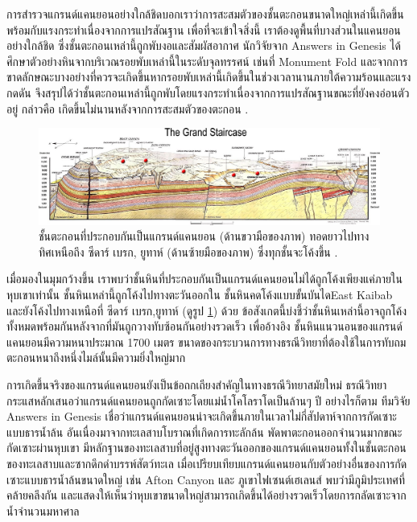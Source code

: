 \documentclass[10pt,twocolumn,letterpaper]{article}
\begin{document}
การสำรวจแกรนด์แคนยอนอย่างใกล้ชิดบอกเราว่าการสะสมตัวของชั้นตะกอนขนาดใหญ่เหล่านี้เกิดขึ้นพร้อมกับแรงกระทำเนื่องจากการแปรสัณฐาน เพื่อที่จะเข้าใจสิ่งนี้ เราต้องดูพื้นที่บางส่วนในแคนยอนอย่างใกล้ชิด ซึ่งชั้นตะกอนเหล่านี้ถูกพับงอและสัมผัสอากาศ นักวิจัยจาก Answers in Genesis \cite{42} ได้ศึกษาตัวอย่างหินจากบริเวณรอยพับเหล่านี้ในระดับจุลทรรศน์ เช่นที่ Monument Fold และจากการขาดลักษณะบางอย่างที่ควรจะเกิดขึ้นหากรอยพับเหล่านี้เกิดขึ้นในช่วงเวลานานภายใต้ความร้อนและแรงกดดัน จึงสรุปได้ว่าชั้นตะกอนเหล่านี้ถูกพับโดยแรงกระทำเนื่องจากการแปรสัณฐานขณะที่ยังคงอ่อนตัวอยู่ กล่าวคือ เกิดขึ้นไม่นานหลังจากการสะสมตัวของตะกอน \cite{43}.

\begin{figure}
\begin{center}
\includegraphics[width=1\textwidth]{Grand_Staircase-big.jpg}
\end{center}
   \caption{ชั้นตะกอนที่ประกอบกันเป็นแกรนด์แคนยอน (ด้านขวามือของภาพ) ทอดยาวไปทางทิศเหนือถึง  ซีดาร์ เบรก, ยูทาห์ (ด้านซ้ายมือของภาพ) ซึ่งทุกชั้นจะโค้งขึ้น \cite{50}.}
\label{fig:4}
\end{figure}

เมื่อมองในมุมกว้างขึ้น เราพบว่าชั้นหินที่ประกอบกันเป็นแกรนด์แคนยอนไม่ได้ถูกโค้งเพียงแค่ภายในหุบเขาเท่านั้น ชั้นหินเหล่านี้ถูกโค้งไปทางตะวันออกใน ชั้นหินคดโค้งแบบขั้นบันไดEast Kaibab \cite{46} และยังโค้งไปทางเหนือที่ ซีดาร์ เบรก,ยูทาห์ (ดูรูป \ref{fig:4}) ด้วย ข้อสังเกตนี้บ่งชี้ว่าชั้นหินเหล่านี้อาจถูกโค้งทั้งหมดพร้อมกันหลังจากที่มันถูกวางทับซ้อนกันอย่างรวดเร็ว เพื่ออ้างอิง ชั้นหินแนวนอนของแกรนด์แคนยอนมีความหนาประมาณ 1700 เมตร ขนาดของกระบวนการทางธรณีวิทยาที่ต้องใช้ในการทับถมตะกอนหนาถึงหนึ่งไมล์นั้นมีความยิ่งใหญ่มาก

การเกิดขึ้นจริงของแกรนด์แคนยอนยังเป็นข้อถกเถียงสำคัญในทางธรณีวิทยาสมัยใหม่ ธรณีวิทยากระแสหลักเสนอว่าแกรนด์แคนยอนถูกกัดเซาะโดยแม่น้ำโคโลราโดเป็นล้านๆ ปี \cite{47} อย่างไรก็ตาม ทีมวิจัย Answers in Genesis เชื่อว่าแกรนด์แคนยอนน่าจะเกิดขึ้นภายในเวลาไม่กี่สัปดาห์จากการกัดเซาะแบบธารน้ำล้น อันเนื่องมาจากทะเลสาบโบราณที่เกิดการทะลักล้น พัดพาตะกอนออกจำนวนมากขณะกัดเซาะผ่านหุบเขา มีหลักฐานของทะเลสาบที่อยู่สูงทางตะวันออกของแกรนด์แคนยอนทั้งในชั้นตะกอนของทะเลสาบและซากดึกดำบรรพ์สัตว์ทะเล เมื่อเปรียบเทียบแกรนด์แคนยอนกับตัวอย่างอื่นของการกัดเซาะแบบธารน้ำล้นขนาดใหญ่ เช่น Afton Canyon และ  ภูเขาไฟเซนต์เฮเลนส์ พบว่ามีภูมิประเทศที่คล้ายคลึงกัน และแสดงให้เห็นว่าหุบเขาขนาดใหญ่สามารถเกิดขึ้นได้อย่างรวดเร็วโดยการกลัดเซาะจากน้ำจำนวนมหาศาล \cite{48}
\end{document}
